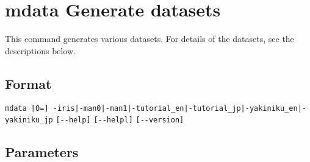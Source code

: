 
%

\section{mdata Generate datasets\label{sect:mdata}}
This command generates various datasets. For details of the datasets, see the descriptions below.

\subsection*{Format}
\verb/mdata [O=] -iris|-man0|-man1|-tutorial_en|-tutorial_jp|-yakiniku_en|-yakiniku_jp/
\verb|[--help]|
\verb|[--helpl]|
\verb|[--version]|\\

\subsection*{Parameters}
